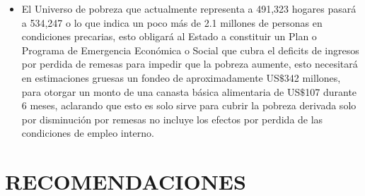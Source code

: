 \begin{itemize}
	\item El Universo de pobreza que actualmente representa a 491,323 hogares pasará a 534,247 o lo que indica un poco más de 2.1 millones de personas en condiciones precarias, esto obligará al Estado a constituir un Plan o Programa de Emergencia Económica o Social que cubra el deficits de ingresos por perdida de remesas para impedir que la pobreza aumente, esto necesitará en estimaciones gruesas un fondeo de aproximadamente US$\$$342 millones, para otorgar un monto de una canasta básica alimentaria de US$\$$107 durante 6 meses, aclarando que esto es solo sirve para cubrir la pobreza derivada solo por disminución por remesas no incluye los efectos por perdida de las condiciones de empleo interno.
\end{itemize}


\newpage
\section{RECOMENDACIONES}


